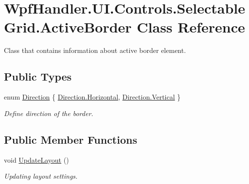 \hypertarget{class_wpf_handler_1_1_u_i_1_1_controls_1_1_selectable_grid_1_1_active_border}{}\section{Wpf\+Handler.\+U\+I.\+Controls.\+Selectable\+Grid.\+Active\+Border Class Reference}
\label{class_wpf_handler_1_1_u_i_1_1_controls_1_1_selectable_grid_1_1_active_border}


Class that contains information about active border element.  


\subsection*{Public Types}
\begin{DoxyCompactItemize}
\item 
enum \mbox{\hyperlink{class_wpf_handler_1_1_u_i_1_1_controls_1_1_selectable_grid_1_1_active_border_af87f3f6373b404c7f93985a70fffd8f0}{Direction}} \{ \mbox{\hyperlink{class_wpf_handler_1_1_u_i_1_1_controls_1_1_selectable_grid_1_1_active_border_af87f3f6373b404c7f93985a70fffd8f0ac1b5fa03ecdb95d4a45dd1c40b02527f}{Direction.\+Horizontal}}, 
\mbox{\hyperlink{class_wpf_handler_1_1_u_i_1_1_controls_1_1_selectable_grid_1_1_active_border_af87f3f6373b404c7f93985a70fffd8f0a06ce2a25e5d12c166a36f654dbea6012}{Direction.\+Vertical}}
 \}
\begin{DoxyCompactList}\small\item\em Define direction of the border. \end{DoxyCompactList}\end{DoxyCompactItemize}
\subsection*{Public Member Functions}
\begin{DoxyCompactItemize}
\item 
void \mbox{\hyperlink{class_wpf_handler_1_1_u_i_1_1_controls_1_1_selectable_grid_1_1_active_border_acd9397efd16845ced60fd9e73016de08}{Update\+Layout}} ()
\begin{DoxyCompactList}\small\item\em Updating layout settings. \end{DoxyCompactList}\end{DoxyCompactItemize}
